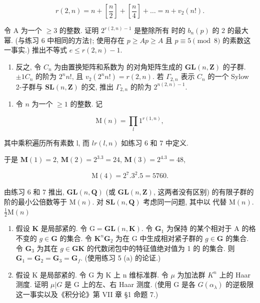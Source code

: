 \[
r (2, n) = n + \left[ \frac {n}{2} \right] + \left[ \frac {n}{4} \right] + \dots = n + v _ {2} (n!).
\]

令 A 为一个 \(\geqslant 3\) 的整数. 证明 \(2^{r(2,n)-1}\) 是整除所有  时的 \(b_n(p)\) 的 2 的最大幂. (与练习 6 中相同的方法†; 使用存在 \(p \geqslant A\)\(p \geqslant A\) 且 \(p \equiv 5 \pmod{8}\) 的素数这一事实.) 推出不等式 \(e \leqslant r(2,n) - 1\).

\begin{enumerate}
\def\labelenumi{(\alph{enumi})}
\setcounter{enumi}{3}
\tightlist
\item
反之, 令 \(C_{n}\) 为由置换矩阵和系数为  的对角矩阵生成的 \(\mathbf{GL}(n,\mathbf{Z})\) 的子群. \(\pm1\)\(C_{n}\) 的阶为 \(2^{n}n!\), 且 \(v_{2}(2^{n}n!) = r(2,n)\). 若 \(\Gamma_{2,n}\) 表示 \(C_{n}\) 的一个 Sylow 2-子群与 \(\mathbf{SL}(n,\mathbf{Z})\) 的交, 推出 \(\Gamma_{2,n}\) 的阶为 \(2^{n(2,n)-1}\).
\end{enumerate}

\begin{enumerate}
\def\labelenumi{\arabic{enumi}.}
\setcounter{enumi}{7}
\tightlist
\item
  令 \(n\) 为一个 \(\geqslant 1\) 的整数. 记
\end{enumerate}

\[
\mathrm{M} (n) = \prod_ {l} 1 ^ {r (1, n)},
\]

其中乘积遍历所有素数 l, 而 \(l\)\(r(l, n)\) 如练习 6 和 7 中定义.

于是 \(\mathbf{M}(1) = 2\), \(\mathbf{M}(2) = 2^3.3 = 24\), \(\mathbf{M}(3) = 2^4.3 = 48\),

\[
\mathrm{M} (4) = 2 ^ {7}. 3 ^ {2}. 5 = 5 7 6 0.
\]

由练习 6 和 7 推出, \(\mathbf{GL}(n,\mathbf{Q})\) (或 \(\mathbf{GL}(n,\mathbf{Z})\), 这两者没有区别) 的有限子群的阶的最小公倍数等于 \(\mathrm{M}(n)\). 对 \(\mathbf{SL}(n,\mathbf{Q})\) 考虑同一问题, 其中以  代替 \(\mathrm{M}(n)\).\(\frac{1}{2}\mathrm{M}(n)\)

\begin{enumerate}
\def\labelenumi{\arabic{enumi}.}
\setcounter{enumi}{8}
\item
  假设 \(\mathbf{K}\) 是局部紧的. 令 \(\mathrm{G} = \mathbf{GL}(n,\mathbf{K})\). 令 \(\mathbf{G}_1\) 为保持  的某个相对于 A 的格不变的 \(g\in \mathbf{G}\) 的集合. 令 \(\mathbf{K}^n\)\(\mathbf{G}_2\) 为在 G 中生成相对紧子群的 \(g\in \mathbf{G}\) 的集合. 令 \(\mathbf{G}_3\) 为其在 \(g\in \mathbf{G}\)\(\mathbf{K}\) 的代数闭包中的特征值绝对值为 1 的  的集合. 则 \(\mathbf{G}_1 = \mathbf{G}_2 = \mathbf{G}_3 = \mathbf{G}_f\). (使用练习 5 (a) 的论证.)
\item
  假设 K 是局部紧的. 令 G 为 K 上 n 维标准群. 令 \(\mu\) 为加法群 \(K^{n}\) 上的 Haar 测度. 证明 \(\mu|G\) 是 G 上的左、右 Haar 测度. (使用 G 是各 \(G(\alpha_{\lambda})\) 的逆极限这一事实以及《积分论》第 VII 章 §1 命题 7.)
\end{enumerate}

